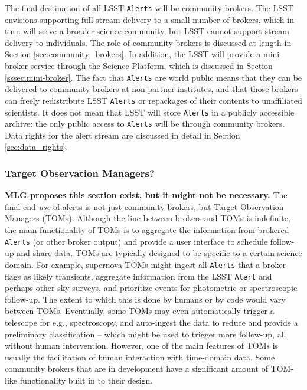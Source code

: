 The final destination of all LSST {\tt Alerts} will be community brokers.
The LSST envisions supporting full-stream delivery to a small number of brokers, which in turn will serve a broader science community, but LSST cannot support stream delivery to individuals.
The role of community brokers is discussed at length in Section \ref{sec:community_brokers}.
In addition, the LSST will provide a mini-broker service through the Science Platform, which is discussed in Section \ref{sssec:mini-broker}.
The fact that {\tt Alerts} are world public means that they can be delivered to community brokers at non-partner institutes, and that those brokers can freely redistribute LSST {\tt Alerts} or repackages of their contents to unaffiliated scientists.
It does not mean that LSST will store {\tt Alerts} in a publicly accessible archive: the only public access to {\tt Alerts} will be through community brokers.
Data rights for the alert stream are discussed in detail in Section \ref{sec:data_rights}.

\subsubsection{Target Observation Managers?}

{\bf MLG proposes this section exist, but it might not be necessary.}  The final end {\em use} of alerts is not just community brokers, but Target Observation Managers (TOMs).
Although the line between brokers and TOMs is indefinite, the main functionality of TOMs is to aggregate the information from brokered {\tt Alerts} (or other broker output) and provide a user interface to schedule follow-up and share data.
TOMs are typically designed to be specific to a certain science domain.
For example, supernova TOMs might ingest all {\tt Alerts} that a broker flags as likely transients, aggregate information from the LSST {\tt Alert} and perhaps other sky surveys, and prioritize events for photometric or spectroscopic follow-up.
The extent to which this is done by humans or by code would vary between TOMs.
Eventually, some TOMs may even automatically trigger a telescope for e.g., spectroscopy, and auto-ingest the data to reduce and provide a preliminary classification -- which might be used to trigger more follow-up, all without human intervention.
However, one of the main features of TOMs is usually the facilitation of human interaction with time-domain data.
Some community brokers that are in development have a significant amount of TOM-like functionality built in to their design.


